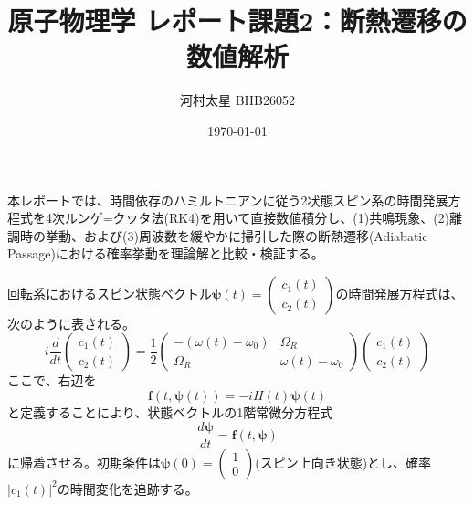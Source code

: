 \documentclass[11pt,a4paper,uplatex]{jsarticle}
\title{\textbf{原子物理学 レポート課題2：断熱遷移の数値解析}}
\author{河村太星 BHB26052}
\date{\today}
\begin{document}
\maketitle

本レポートでは、時間依存のハミルトニアンに従う2状態スピン系の時間発展方程式を4次ルンゲ=クッタ法(RK4)を用いて直接数値積分し、(1)共鳴現象、(2)離調時の挙動、および(3)周波数を緩やかに掃引した際の断熱遷移(Adiabatic Passage)における確率挙動を理論解と比較・検証する。

回転系におけるスピン状態ベクトル$\boldsymbol{\psi}(t) = \begin{pmatrix} c_1(t) \\ c_2(t) \end{pmatrix}$の時間発展方程式は、次のように表される。
\begin{equation}
    i \frac{d}{dt} \begin{pmatrix} c_1(t) \\ c_2(t) \end{pmatrix} = \frac{1}{2} \begin{pmatrix} - (\omega(t) - \omega_0) & \Omega_R \\ \Omega_R & \omega(t) - \omega_0 \end{pmatrix} \begin{pmatrix} c_1(t) \\ c_2(t) \end{pmatrix}
\end{equation}
ここで、右辺を
\begin{equation}
    \boldsymbol{f}(t, \boldsymbol{\psi}(t)) = -i H(t) \boldsymbol{\psi}(t)
\end{equation}
と定義することにより、状態ベクトルの1階常微分方程式
\begin{equation}
    \frac{d\boldsymbol{\psi}}{dt} = \boldsymbol{f}(t, \boldsymbol{\psi})
\end{equation}
に帰着させる。初期条件は$\boldsymbol{\psi}(0) = \begin{pmatrix} 1 \\ 0 \end{pmatrix}$(スピン上向き状態)とし、確率$|c_1(t)|^2$の時間変化を追跡する。
\end{document}

